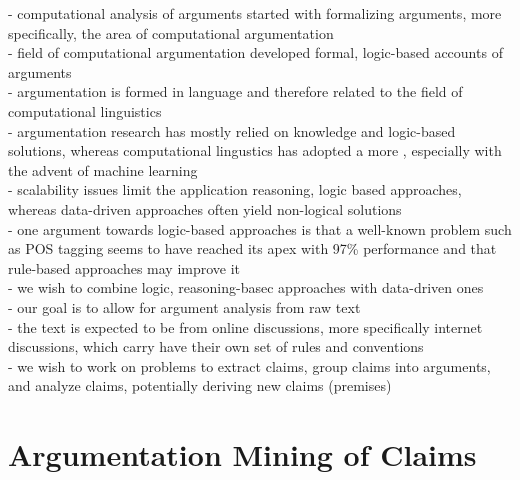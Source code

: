 \noindent - computational analysis of arguments started with formalizing arguments, more
specifically, the area of computational argumentation \\
- field of computational argumentation developed formal, logic-based 
accounts of arguments \\
- argumentation is formed in language and therefore related to the field
of computational linguistics \\
- argumentation research has mostly relied on knowledge and 
logic-based solutions, whereas computational lingustics has adopted a 
more , especially with the advent of machine learning \\
- scalability issues limit the application reasoning, logic based
approaches, whereas data-driven approaches often yield non-logical
solutions \\
- one argument towards logic-based approaches 
is that a well-known problem such as POS tagging seems to have reached its
apex with 97\% performance and that rule-based approaches may improve it 
\citep{manning2011part} \\
- we wish to combine logic, reasoning-basec approaches with data-driven ones \\

\noindent - our goal is to allow for argument analysis from raw text \\
- the text is expected to be from online discussions, more specifically internet 
discussions, which carry have their own set of rules and conventions \\
- we wish to work on problems to extract claims, group claims into arguments, and analyze 
claims, potentially deriving new claims (premises) \\


\section{Argumentation Mining of Claims}

